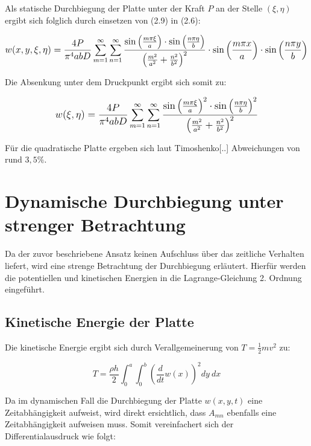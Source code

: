 Als statische Durchbiegung der Platte unter der Kraft $P$ an der Stelle $(\xi, \eta)$ ergibt sich folglich durch einsetzen von (2.9) in (2.6):
 
\begin{equation}
 \mathlarger{
 	w(x,y,\xi,\eta) = \frac{4P}{\pi^4 a b D} 
 	\sum_{m = 1}^{\infty} \sum_{n = 1}^{\infty}
 	\dfrac{
 		\sin\left(\frac{m \pi \xi}{a}\right) 
 		\cdot \sin\left(\frac{n \pi \eta}{b}\right) 
 	}{
 		\left( 
 		\frac{m^2}{a^2} +
 		\frac{n^2}{b^2}
 		\right)^2
 	}
 	\cdot \sin\left(\frac{m \pi x}{a}\right) 
 	\cdot \sin\left(\frac{n \pi y}{b}\right) 
 }
 \end{equation}
 
Die Absenkung unter dem Druckpunkt ergibt sich somit zu:

\begin{equation}
 \mathlarger{
	w(\xi,\eta) = \frac{4P}{\pi^4 a b D} 
	\sum_{m = 1}^{\infty} \sum_{n = 1}^{\infty}
	\dfrac{
		\sin\left(\frac{m \pi \xi}{a}\right)^2 
		\cdot 	\sin\left(\frac{n \pi \eta}{b}\right) ^2
	}{
		\left( 
		\frac{m^2}{a^2} +
		\frac{n^2}{b^2}
		\right)^2
	}
}
\end{equation}

Für die quadratische Platte ergeben sich laut Timoshenko[..] Abweichungen von rund $3,5\%$.


\section{Dynamische Durchbiegung unter strenger Betrachtung}

Da der zuvor beschriebene Ansatz keinen Aufschluss über das zeitliche Verhalten liefert, wird eine strenge Betrachtung der Durchbiegung erläutert. Hierfür werden die potentiellen und kinetischen Energien in die Lagrange-Gleichung 2. Ordnung eingeführt.

\subsection{Kinetische Energie der Platte}

Die kinetische Energie ergibt sich durch Verallgemeinerung von $T = \frac{1}{2} mv^2$ zu:

\begin{equation}
T = \dfrac{\rho h}{2} \int_{0}^{a} \int_{0}^{b} \left(\dfrac{d}{dt} w(x)\right)^2 dy \ dx
\end{equation}

Da im dynamischen Fall die Durchbiegung der Platte $w(x,y,t)$ eine Zeitabhängigkeit aufweist, wird direkt ersichtlich, dass $A_{mn}$ ebenfalls eine Zeitabhängigkeit aufweisen muss. Somit vereinfachert sich der Differentialausdruck wie folgt:


